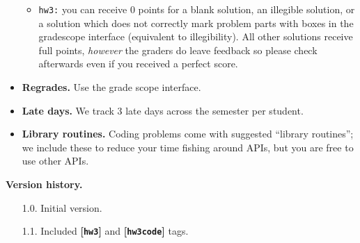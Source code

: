 \documentclass{article}
\def\hw{\textbf{[\texttt{hw3}]}\xspace}
\def\hwcode{\textbf{[\texttt{hw3code}]}\xspace}
\theoremstyle{definition}
\theoremstyle{remark}
\begin{document}
\begin{itemize}
\begin{itemize}
        \item
          \texttt{hw3:} you can receive $0$ points for a blank solution, an illegible solution,
          or a solution which does not correctly mark problem parts with boxes in the gradescope
          interface (equivalent to illegibility).
          All other solutions receive full points, \emph{however} the graders do leave feedback
          so please check afterwards even if you received a perfect score.

      \end{itemize}

    \item
      \textbf{Regrades.}  Use the grade scope interface.

    \item
      \textbf{Late days.}
      We track 3 late days across the semester per student.

    \item
      \textbf{Library routines.}
      Coding problems come with suggested ``library routines''; we include these to reduce
      your time fishing around APIs, but you are free to use other APIs.
  \end{itemize}

\noindent\textbf{Version history.}
\begin{enumerate}
    \item[1.0.] Initial version.
    \item[1.1.] Included \hw and \hwcode tags.
\end{enumerate}
\end{document}
